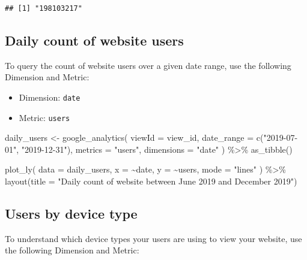 \documentclass[
]{book}
\newenvironment{Shaded}{\begin{snugshade}}{\end{snugshade}}
\newcommand{\AttributeTok}[1]{\textcolor[rgb]{0.77,0.63,0.00}{#1}}
\newcommand{\FunctionTok}[1]{\textcolor[rgb]{0.00,0.00,0.00}{#1}}
\newcommand{\NormalTok}[1]{#1}
\newcommand{\OtherTok}[1]{\textcolor[rgb]{0.56,0.35,0.01}{#1}}
\newcommand{\SpecialCharTok}[1]{\textcolor[rgb]{0.00,0.00,0.00}{#1}}
\newcommand{\StringTok}[1]{\textcolor[rgb]{0.31,0.60,0.02}{#1}}
\providecommand{\tightlist}{%
  \setlength{\itemsep}{0pt}\setlength{\parskip}{0pt}}
\begin{document}
\begin{verbatim}
## [1] "198103217"
\end{verbatim}

\hypertarget{daily-count-of-website-users}{%
\subsection{Daily count of website users}\label{daily-count-of-website-users}}

To query the count of website users over a given date range, use the following Dimension and Metric:

\begin{itemize}
\tightlist
\item
  Dimension: \texttt{date}
\item
  Metric: \texttt{users}
\end{itemize}

\begin{Shaded}
\begin{Highlighting}[]
\NormalTok{daily\_users }\OtherTok{\textless{}{-}} \FunctionTok{google\_analytics}\NormalTok{(}
  \AttributeTok{viewId =}\NormalTok{ view\_id,}
  \AttributeTok{date\_range =} \FunctionTok{c}\NormalTok{(}\StringTok{"2019{-}07{-}01"}\NormalTok{, }\StringTok{"2019{-}12{-}31"}\NormalTok{),}
  \AttributeTok{metrics =} \StringTok{"users"}\NormalTok{,}
  \AttributeTok{dimensions =} \StringTok{"date"}
\NormalTok{) }\SpecialCharTok{\%\textgreater{}\%}
  \FunctionTok{as\_tibble}\NormalTok{()}

\FunctionTok{plot\_ly}\NormalTok{(}
  \AttributeTok{data =}\NormalTok{ daily\_users,}
  \AttributeTok{x =} \SpecialCharTok{\textasciitilde{}}\NormalTok{date,}
  \AttributeTok{y =} \SpecialCharTok{\textasciitilde{}}\NormalTok{users,}
  \AttributeTok{mode =} \StringTok{"lines"}
\NormalTok{) }\SpecialCharTok{\%\textgreater{}\%}
  \FunctionTok{layout}\NormalTok{(}\AttributeTok{title =} \StringTok{"Daily count of website between June 2019 and December 2019"}\NormalTok{)}
\end{Highlighting}
\end{Shaded}

\hypertarget{users-by-device-type}{%
\subsection{Users by device type}\label{users-by-device-type}}

To understand which device types your users are using to view your website, use the following Dimension and Metric:
\end{document}
